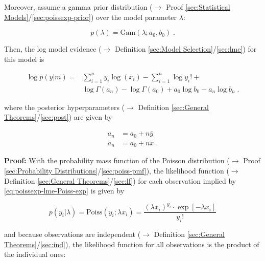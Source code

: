 \documentclass[a4paper,12pt,twoside]{book}
\begin{document}
Moreover, assume a gamma prior distribution ($\rightarrow$ Proof \ref{sec:Statistical Models}/\ref{sec:poissexp-prior}) over the model parameter $\lambda$:

\begin{equation} \label{eq:poissexp-lme-Poiss-exp-prior}
p(\lambda) = \mathrm{Gam}(\lambda; a_0, b_0) \; .
\end{equation}

Then, the log model evidence ($\rightarrow$ Definition \ref{sec:Model Selection}/\ref{sec:lme}) for this model is

\begin{equation} \label{eq:poissexp-lme-Poiss-exp-LME}
\begin{split}
\log p(y|m) = &\sum_{i=1}^n y_i \log(x_i) - \sum_{i=1}^n \log y_i ! + \\ 
&\log \Gamma(a_n) - \log \Gamma(a_0) + a_0 \log b_0 - a_n \log b_n \; .
\end{split}
\end{equation}

where the posterior hyperparameters ($\rightarrow$ Definition \ref{sec:General Theorems}/\ref{sec:post}) are given by

\begin{equation} \label{eq:poissexp-lme-Poiss-exp-post-par}
\begin{split}
a_n &= a_0 + n \bar{y} \\
a_n &= a_0 + n \bar{x} \; .
\end{split}
\end{equation}


\vspace{1em}
\textbf{Proof:} With the probability mass function of the Poisson distribution ($\rightarrow$ Proof \ref{sec:Probability Distributions}/\ref{sec:poiss-pmf}), the likelihood function ($\rightarrow$ Definition \ref{sec:General Theorems}/\ref{sec:lf}) for each observation implied by \eqref{eq:poissexp-lme-Poiss-exp} is given by

\begin{equation} \label{eq:poissexp-lme-Poiss-exp-LF-s1}
p(y_i|\lambda) = \mathrm{Poiss}(y_i; \lambda x_i) = \frac{(\lambda x_i)^{y_i} \cdot \exp\left[-\lambda x_i\right]}{y_i !}
\end{equation}

and because observations are independent ($\rightarrow$ Definition \ref{sec:General Theorems}/\ref{sec:ind}), the likelihood function for all observations is the product of the individual ones:
\end{document}
